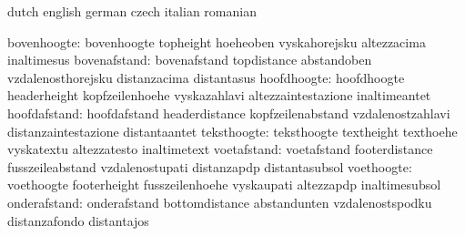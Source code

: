 



\startcommands                    dutch                            english
                                  german                           czech
                                  italian                          romanian

                     bovenhoogte: bovenhoogte                      topheight
                                  hoeheoben                        vyskahorejsku
                                  altezzacima                      inaltimesus
                    bovenafstand: bovenafstand                     topdistance
                                  abstandoben                      vzdalenosthorejsku
                                  distanzacima                     distantasus
                     hoofdhoogte: hoofdhoogte                      headerheight
                                  kopfzeilenhoehe                  vyskazahlavi
                                  altezzaintestazione              inaltimeantet
                    hoofdafstand: hoofdafstand                     headerdistance
                                  kopfzeilenabstand                vzdalenostzahlavi
                                  distanzaintestazione             distantaantet
                     teksthoogte: teksthoogte                      textheight
                                  texthoehe                        vyskatextu
                                  altezzatesto                     inaltimetext
                     voetafstand: voetafstand                      footerdistance
                                  fusszeileabstand                 vzdalenostupati
                                  distanzapdp                      distantasubsol
                      voethoogte: voethoogte                       footerheight
                                  fusszeilenhoehe                  vyskaupati
                                  altezzapdp                       inaltimesubsol
                    onderafstand: onderafstand                     bottomdistance
                                  abstandunten                     vzdalenostspodku
                                  distanzafondo                    distantajos
